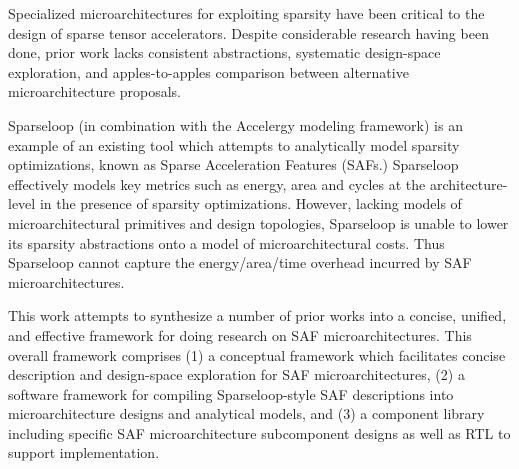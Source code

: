 % 
% 
%


Specialized microarchitectures for exploiting sparsity have been critical to the design of sparse tensor accelerators. Despite considerable research having been done, prior work lacks consistent abstractions, systematic design-space exploration, and apples-to-apples comparison between alternative microarchitecture proposals.

Sparseloop (in combination with the Accelergy modeling framework) is an example of an existing tool which attempts to analytically model sparsity optimizations, known as Sparse Acceleration Features (SAFs.) Sparseloop effectively models key metrics such as energy, area and cycles at the architecture-level in the presence of sparsity optimizations. However, lacking models of microarchitectural primitives and design topologies, Sparseloop is unable to lower its sparsity abstractions onto a model of microarchitectural costs. Thus Sparseloop cannot capture the energy/area/time overhead incurred by SAF microarchitectures.

This work attempts to synthesize a number of prior works into a concise, unified, and effective framework for doing research on SAF microarchitectures. This overall framework comprises (1) a conceptual framework which facilitates concise description and design-space exploration for SAF microarchitectures, (2) a software framework for compiling Sparseloop-style SAF descriptions into microarchitecture designs and analytical models, and (3) a component library including specific SAF microarchitecture subcomponent designs as well as RTL to support implementation.